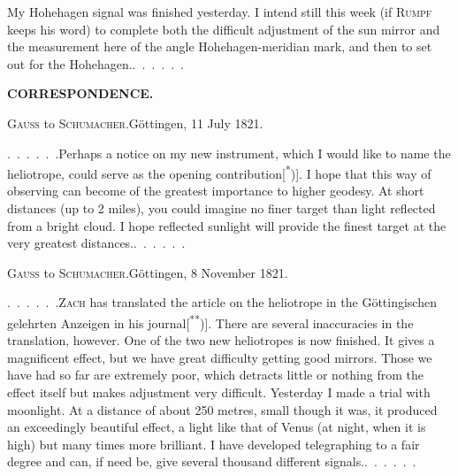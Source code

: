 \par\noindent\hspace*{\parindent}My Hohehagen signal was finished yesterday. I intend still this week (if \textsc{Rumpf} keeps his word) to complete both the difficult adjustment of the sun mirror and the measurement here of the angle Hohehagen-meridian mark, and then to set out for the Hohehagen.\enspace .\ .\ .\ .\ .\ .

\par\clearpage
\noindent{}\hfill{\small\textbf{CORRESPONDENCE.}}\hfill\null\par\bigskip
\begin{center}{\large\textsc{Gauss} to \textsc{Schumacher}.\quad Göttingen, 11 July 1821.}\end{center}
\par\noindent\hspace*{\parindent}.\ .\ .\ .\ .\ .\enspace Perhaps a notice on my new instrument, which I would like to name the heliotrope, could serve as the opening contribution[\textsuperscript{*})]. I hope that this way of observing can become of the greatest importance to higher geodesy. At short distances (up to 2 miles), you could imagine no finer target than light reflected from a bright cloud. I hope reflected sunlight will provide the finest target at the very greatest distances.\enspace .\ .\ .\ .\ .\ .
\par\bigskip
\begin{center}{\large\textsc{Gauss} to \textsc{Schumacher}.\quad Göttingen, 8 November 1821.}\end{center}
\par\noindent\hspace*{\parindent}.\ .\ .\ .\ .\ .\enspace \textsc{Zach} has translated the article on the heliotrope in the Göttingischen gelehrten Anzeigen in his journal[\textsuperscript{**})]. There are several inaccuracies in the translation, however. One of the two new heliotropes is now finished. It gives a magnificent effect, but we have great difficulty getting good mirrors. Those we have had so far are extremely poor, which detracts little or nothing from the effect itself but makes adjustment very difficult. Yesterday I made a trial with moonlight. At a distance of about 250 metres, small though it was, it produced an exceedingly beautiful effect, a light like that of Venus (at night, when it is high) but many times more brilliant. I have developed telegraphing to a fair degree and can, if need be, give several thousand different signals.\enspace .\ .\ .\ .\ .\ .
